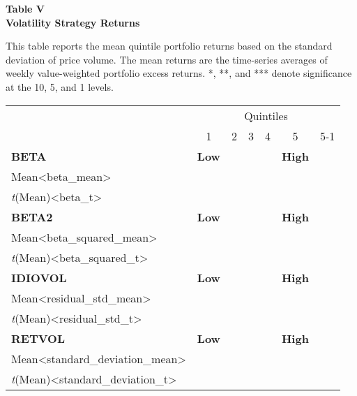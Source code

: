 \documentclass{article}
\begin{document}
    \begin{center}
        \textbf{
        Table V
        \\
        Volatility Strategy Returns
        }
        \begin{justify}
            \footnotesize{
                This table reports the mean quintile portfolio returns based on the standard deviation of price volume. The mean returns are the time-series averages of weekly value-weighted portfolio excess returns. *, **, and *** denote significance at the 10, 5, and 1 levels.
            }
        \end{justify}
        \-
        \begin{tabular}{lcccccr}
            \toprule
            \multicolumn{1}{c}{} & \multicolumn{6}{c}{Quintiles}
            \\
            \cmidrule(lr){2-7}
            & 1 & 2 & 3 & 4 & 5 & 5-1
            \\
            \midrule
            \multicolumn{1}{l}{\textbf{BETA}} & \multicolumn{1}{c}{\textbf{Low}} & \multicolumn{3}{c}{} & \multicolumn{1}{c}{\textbf{High}}
            \\
            Mean<beta_mean>
            \\
            \textit{t}(Mean)<beta_t>
            \\ [0.2cm]
            \multicolumn{1}{l}{\textbf{BETA2}} & \multicolumn{1}{c}{\textbf{Low}} & \multicolumn{3}{c}{} & \multicolumn{1}{c}{\textbf{High}}
            \\
            Mean<beta_squared_mean>
            \\
            \textit{t}(Mean)<beta_squared_t>
            \\ [0.2cm]
            \multicolumn{1}{l}{\textbf{IDIOVOL}} & \multicolumn{1}{c}{\textbf{Low}} & \multicolumn{3}{c}{} & \multicolumn{1}{c}{\textbf{High}}
            \\
            Mean<residual_std_mean>
            \\
            \textit{t}(Mean)<residual_std_t>
            \\ [0.2cm]
            \multicolumn{1}{l}{\textbf{RETVOL}} & \multicolumn{1}{c}{\textbf{Low}} & \multicolumn{3}{c}{} & \multicolumn{1}{c}{\textbf{High}}
            \\
            Mean<standard_deviation_mean>
            \\
            \textit{t}(Mean)<standard_deviation_t>
            \\ [0.2cm]

\end{tabular}
\end{center}
\end{document}
